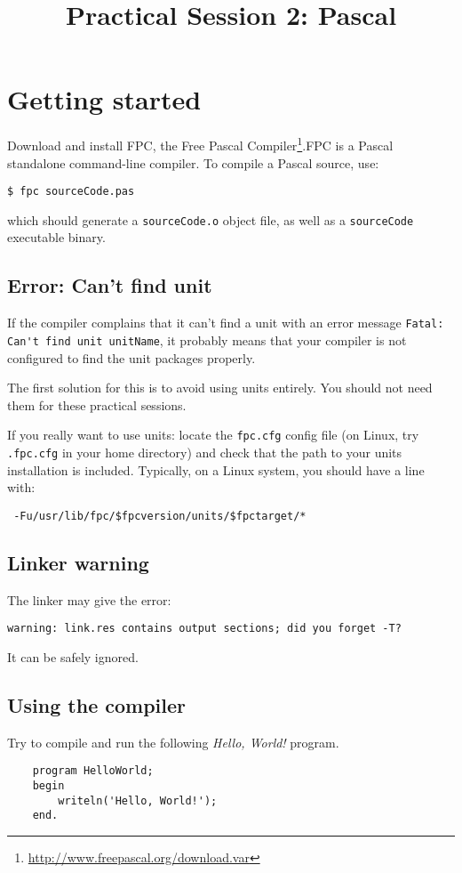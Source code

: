 \documentclass{../../tp}
\title{Practical Session 2: Pascal}
\author{}
\begin{document}
\maketitle


\section{Getting started}

Download and install \textsf{FPC}, the \textsf{Free Pascal Compiler}\footnote{ \url{http://www.freepascal.org/download.var}}.\textsf{FPC} is a \textsf{Pascal} standalone command-line compiler. To compile a \textsf{Pascal} source, use: 

\verb|$ fpc sourceCode.pas|

which should generate a \verb|sourceCode.o| object file, as well as a \verb|sourceCode| executable binary.

\subsection{Error: Can't find unit}

If the compiler complains that it can't find a unit with an error message \verb|Fatal: Can't find unit unitName|, it probably means that your compiler is not configured to find the unit packages properly.

The first solution for this is to avoid using units entirely. You should not need them for these practical sessions.

If you really want to use units: locate the \verb|fpc.cfg| config file (on Linux, try \verb|.fpc.cfg| in your home directory) and check that the path to your units installation is included. Typically, on a Linux system, you should have a line with:

\verb| -Fu/usr/lib/fpc/$fpcversion/units/$fpctarget/*|

\subsection{Linker warning}

The linker may give the error:

\verb|warning: link.res contains output sections; did you forget -T?|

It can be safely ignored. 

\subsection{Using the compiler}
\begin{instruction}
	Try to compile and run the following \emph{Hello, World!} program.
	
	\begin{verbatim}
	program HelloWorld;
	begin 
		writeln('Hello, World!');
	end.
	\end{verbatim}
\end{instruction}
\end{document}
